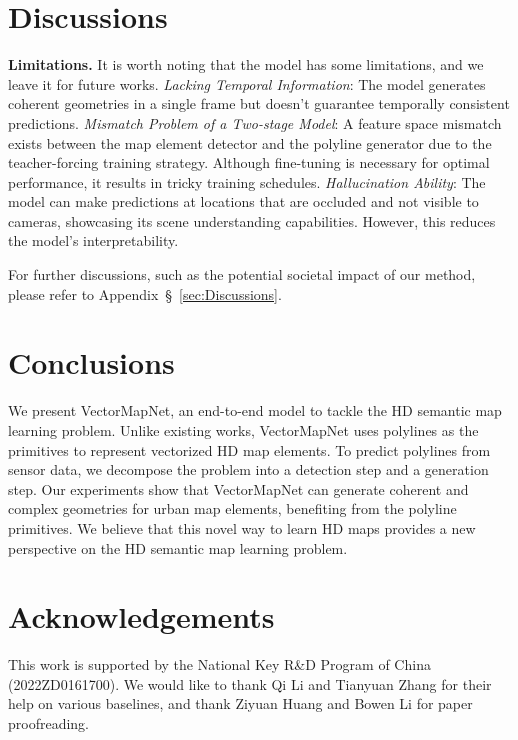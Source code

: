\documentclass{article}
\theoremstyle{plain}
\theoremstyle{definition}
\theoremstyle{remark}
\begin{document}
\section{Discussions}
\noindent\textbf{Limitations.} It is worth noting that the model has some limitations, and we leave it for future works. \textit{Lacking Temporal Information}: The model generates coherent geometries in a single frame but doesn't guarantee temporally consistent predictions. \textit{Mismatch Problem of a Two-stage Model}: A feature space mismatch exists between the map element detector and the polyline generator due to the teacher-forcing training strategy. Although fine-tuning is necessary for optimal performance, it results in tricky training schedules. \textit{Hallucination Ability}: The model can make predictions at locations that are occluded and not visible to cameras, showcasing its scene understanding capabilities. However, this reduces the model's interpretability.

For further discussions, such as the potential societal impact of our method, please refer to Appendix~\S~\ref{sec:Discussions}.

\section{Conclusions}
We present VectorMapNet, an end-to-end model to tackle the HD semantic map learning problem. Unlike existing works, VectorMapNet uses polylines as the primitives to represent vectorized HD map elements. To predict polylines from sensor data, we decompose the problem into a detection step and a generation step. Our experiments show that VectorMapNet can generate coherent and complex geometries for urban map elements, benefiting from the polyline primitives. We believe that this novel way to learn HD maps provides a new perspective on the HD semantic map learning problem.




\section*{Acknowledgements}
This work is supported by the National Key R\&D Program of China (2022ZD0161700). 
We would like to thank Qi Li and Tianyuan Zhang for their help on various baselines, and thank Ziyuan Huang and Bowen Li for paper proofreading.

\clearpage
\end{document}
